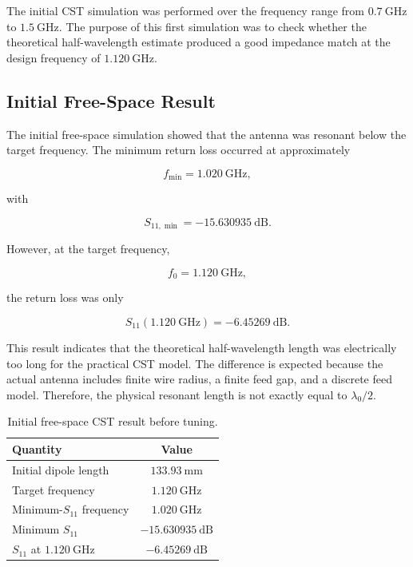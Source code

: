 The initial CST simulation was performed over the frequency range from \(0.7~\mathrm{GHz}\) to \(1.5~\mathrm{GHz}\). The purpose of this first simulation was to check whether the theoretical half-wavelength estimate produced a good impedance match at the design frequency of \(1.120~\mathrm{GHz}\).

\subsection{Initial Free-Space Result}

The initial free-space simulation showed that the antenna was resonant below the target frequency. The minimum return loss occurred at approximately

\[
f_{\min} = 1.020~\mathrm{GHz},
\]

with

\[
S_{11,\min} = -15.630935~\mathrm{dB}.
\]

However, at the target frequency,

\[
f_0 = 1.120~\mathrm{GHz},
\]

the return loss was only

\[
S_{11}(1.120~\mathrm{GHz}) = -6.45269~\mathrm{dB}.
\]

This result indicates that the theoretical half-wavelength length was electrically too long for the practical CST model. The difference is expected because the actual antenna includes finite wire radius, a finite feed gap, and a discrete feed model. Therefore, the physical resonant length is not exactly equal to \(\lambda_0/2\).

\begin{table}[htbp]
\centering
\caption{Initial free-space CST result before tuning.}
\label{tab:initial-free-space-result}
\begin{tabular}{lc}
\hline
\textbf{Quantity} & \textbf{Value} \\
\hline
Initial dipole length & \(133.93~\mathrm{mm}\) \\
Target frequency & \(1.120~\mathrm{GHz}\) \\
Minimum-\(S_{11}\) frequency & \(1.020~\mathrm{GHz}\) \\
Minimum \(S_{11}\) & \(-15.630935~\mathrm{dB}\) \\
\(S_{11}\) at \(1.120~\mathrm{GHz}\) & \(-6.45269~\mathrm{dB}\) \\
\hline
\end{tabular}
\end{table}

